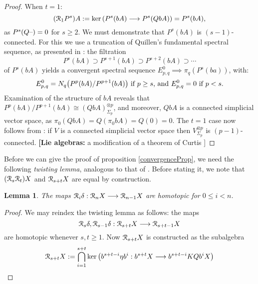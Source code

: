 \documentclass[11pt]{amsart}
\theoremstyle{plain}
\newtheorem{lem}[thm]{Lemma}
\theoremstyle{definition}
\renewcommand{\ker}{\textup{ker}\,}
\newcommand{\DASH}{\textup{--}}
\renewcommand{\to}{\longrightarrow}
\newcommand{\calR}{\mathcal{R}}
\theoremstyle{plain}
\newcommand{\caldup}[1]{\calR_{\smash{#1}}}
\newcommand{\barConstructionMightAbbreviate}{b}
\begin{document}
\begin{Bousfield-Kan spectral sequence}
\begin{proof}
When $t=1$:
\[(\caldup{1}P^{s})A:=\ker(P^{s}(\barConstructionMightAbbreviate A)\to P^{s}(Q\barConstructionMightAbbreviate A))=P^{s}(\barConstructionMightAbbreviate A),\]
as $P^s(Q\DASH)=0$ for $s\geq2$. We must demonstrate that $P^s(\barConstructionMightAbbreviate A)$ is $(s-1)$-connected. For this we use a truncation of Quillen's fundamental spectral sequence, as presented in \cite[Thm 6.2]{MR1089001}: the filtration
\[P^s(\barConstructionMightAbbreviate A)\supset P^{s+1}(\barConstructionMightAbbreviate A)\supset P^{s+2}(\barConstructionMightAbbreviate A)\supset\cdots \]
of $P^s(\barConstructionMightAbbreviate A)$ yields a convergent spectral sequence  $E^0_{p,q}\implies \pi_q(P^s(\barConstructionMightAbbreviate a))$, with:
\[E^0_{p,q}=N_q\bigl(P^{p}(\barConstructionMightAbbreviate A)/P^{p+1}(\barConstructionMightAbbreviate A)\bigr)\textup{ if $p\geq s$, and }E^0_{p,q}=0\textup{ if $p<s$.}\]
Examination of the structure of $\barConstructionMightAbbreviate A$ reveals that $P^{p}(\barConstructionMightAbbreviate A)/P^{p+1}(\barConstructionMightAbbreviate A)\cong (Q\barConstructionMightAbbreviate A)^{\otimes p}_{\Sigma_p}$, and moreover, $Q\barConstructionMightAbbreviate A$ is a connected simplicial vector space, as $\pi_0(Q\barConstructionMightAbbreviate A)=Q(\pi_0\barConstructionMightAbbreviate A)=Q(0)=0$. The $t=1$ case now follows from \cite[Satz 12.1]{DoldPuppeSuspension.pdf}: if $V$ is a connected simplicial vector space then $V^{\otimes p}_{\Sigma_p}$ is $(p-1)$-connected. \textbf{[Lie algebras:} a modification \cite[4.3]{6Author.pdf} of a theorem of Curtis \cite[\S5]{Curtis_LCS.pdf}]
\end{proof}
Before we can give the proof of proposition \ref{convergenceProp}, we need the following \emph{twisting lemma}, analogous to that of \cite{BK_pairings.pdf}. Before stating it, we note that $(\caldup{s}\caldup{t})X$ and $\caldup{s+t}X$ are equal by construction.
\begin{lem}
\label{DsDt=Dt+s}
The maps $\caldup{i}\delta:\caldup{n}X\to \caldup{n-1}X$ are homotopic for $0\leq i< n$.
\end{lem}
\begin{proof}
We may reindex the twisting lemma as follows: the maps 
\[\caldup{s}\delta,\caldup{s-1}\delta:\caldup{s+t}X\to \caldup{s+t-1}X\]
are homotopic whenever $s,t\geq1$. Now $\caldup{s+t}X$ is constructed as the subalgebra
\[\caldup{s+t}X:= \bigcap_{i=1}^{s+t}\ker\!\left(\barConstructionMightAbbreviate^{s+t-i}\eta \barConstructionMightAbbreviate^{i}:\barConstructionMightAbbreviate^{s+t}X\to \barConstructionMightAbbreviate^{s+t-i}KQ\barConstructionMightAbbreviate^{i}X\right)\]

\end{proof}
\end{Bousfield-Kan spectral sequence}
\end{document}
